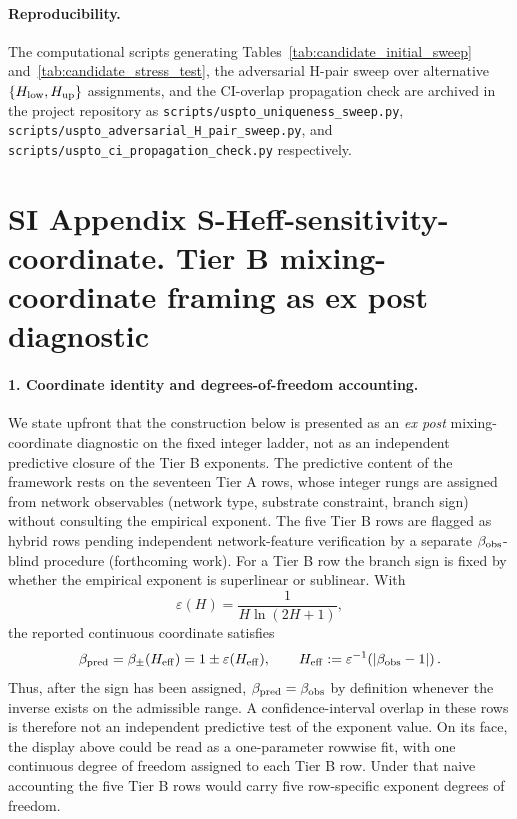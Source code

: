 \paragraph{Reproducibility.}
The computational scripts generating Tables~\ref{tab:candidate_initial_sweep} and~\ref{tab:candidate_stress_test}, the adversarial H-pair sweep over alternative \(\{H_{\rm low},H_{\rm up}\}\) assignments, and the CI-overlap propagation check are archived in the project repository as \texttt{scripts/uspto\_uniqueness\_sweep.py}, \texttt{scripts/uspto\_adversarial\_H\_pair\_sweep.py}, and \texttt{scripts/uspto\_ci\_propagation\_check.py} respectively.

\clearpage
\section*{SI Appendix S-Heff-sensitivity-coordinate. Tier B mixing-coordinate framing as ex post diagnostic}
\sloppy
\label{sec:S-Heff-sensitivity-coordinate}

\paragraph{1. Coordinate identity and degrees-of-freedom accounting.}
We state upfront that the construction below is presented as an \emph{ex post} mixing-coordinate diagnostic on the fixed integer ladder, not as an independent predictive closure of the Tier B exponents. The predictive content of the framework rests on the seventeen Tier A rows, whose integer rungs are assigned from network observables (network type, substrate constraint, branch sign) without consulting the empirical exponent. The five Tier B rows are flagged as hybrid rows pending independent network-feature verification by a separate \(\beta_{\rm obs}\)-blind procedure (forthcoming work). For a Tier B row the branch sign is fixed by whether the empirical exponent is superlinear or sublinear. With
\[
\varepsilon(H)=\frac{1}{H\ln(2H+1)},
\]
the reported continuous coordinate satisfies
\[
\beta_{\rm pred}
=
\beta_\pm(H_{\rm eff})
=
1\pm \varepsilon(H_{\rm eff}),
\qquad
H_{\rm eff}:=\varepsilon^{-1}\!\left(|\beta_{\rm obs}-1|\right).
\]
Thus, after the sign has been assigned, \(\beta_{\rm pred}=\beta_{\rm obs}\) by definition whenever the inverse exists on the admissible range. A confidence-interval overlap in these rows is therefore not an independent predictive test of the exponent value. On its face, the display above could be read as a one-parameter rowwise fit, with one continuous degree of freedom assigned to each Tier B row. Under that naive accounting the five Tier B rows would carry five row-specific exponent degrees of freedom.

